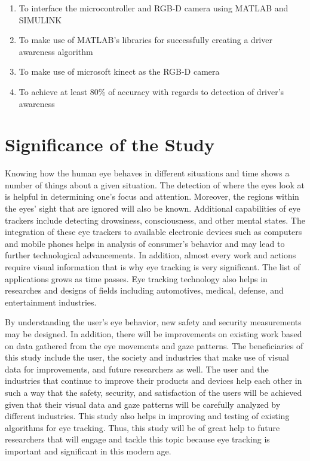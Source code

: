 \begin{enumerate}
	
	\item To interface the microcontroller and RGB-D camera using MATLAB and SIMULINK
	
	\item To make use of MATLAB’s libraries for successfully creating a driver awareness algorithm 
	
	\item To make use of microsoft kinect as the RGB-D camera
	
	\item To achieve at least 80\% of accuracy with regards to detection of driver’s awareness
	

	
\end{enumerate}



\section{Significance of the Study}

Knowing how the human eye behaves in different situations and time shows a number of things about a given situation. The detection of where the eyes look at is helpful in determining one’s focus and attention. Moreover, the regions within the eyes’ sight that are ignored will also be known. Additional capabilities of eye trackers include detecting drowsiness, consciousness, and other mental states. The integration of these eye trackers to available electronic devices such as computers and mobile phones helps in analysis of consumer’s behavior and may lead to further technological advancements. In addition, almost every work and actions require visual information that is why eye tracking is very significant. The list of applications grows as time passes. Eye tracking technology also helps in researches and designs of fields including automotives, medical, defense, and entertainment industries. 

By understanding the user’s eye behavior, new safety and security measurements may be designed. In addition, there will be improvements on existing work based on data gathered from the eye movements and gaze patterns. The beneficiaries of this study include the user, the society and industries that make use of visual data for improvements, and future researchers as well. The user and the industries that continue to improve their products and devices help each other in such a way that the safety, security, and satisfaction of the users will be achieved given that their visual data and gaze patterns will be carefully analyzed by different industries. This study also helps in improving and testing of existing algorithms for eye tracking. Thus, this study will be of great help to future researchers that will engage and tackle this topic because eye tracking is important and significant in this modern age. 




